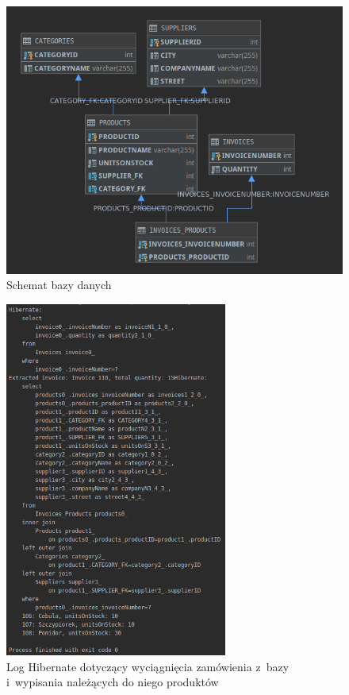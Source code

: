 \documentclass[12pt, a4paper]{mwart}
\begin{document}
\begin{figure}[ht]
  \centering
  \includegraphics[scale=0.75]{VII/7-3.png}
  \caption{Schemat bazy danych}
  \label{rys:7.3}
\end{figure}

\begin{figure}[ht]
  \centering
  \includegraphics[width=0.65\textwidth]{VII/7-4.png}
  \caption{Log Hibernate dotyczący wyciągnięcia zamówienia z~bazy i~wypisania należących do niego produktów}
  \label{rys:7.4}
\end{figure}
\end{document}
